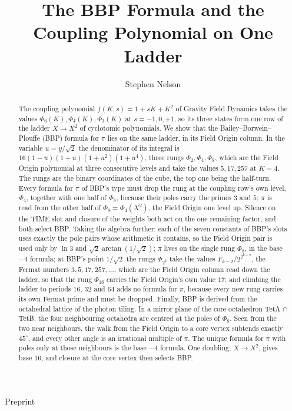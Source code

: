 \documentclass[twocolumn]{iopjournal}
\renewcommand{\articletype}[1]{%
  {\vspace*{-8mm}\noindent \Large \sf Preprint}\par
  \vspace*{6mm}\noindent{\scriptsize \sf{\bfseries \MakeUppercase{#1}}}}
\begin{document}
\articletype{Supplementary Material}

\title{The BBP Formula and the Coupling Polynomial on One Ladder}

\author{Stephen Nelson}



\begin{abstract}
The coupling polynomial $f(K,s) = 1 + sK + K^2$ of Gravity Field
Dynamics takes the values $\Phi_6(K), \Phi_4(K), \Phi_3(K)$ at
$s = -1, 0, +1$, so its three states form one row of the ladder
$X \to X^2$ of cyclotomic polynomials. We show that the
Bailey--Borwein--Plouffe (BBP) formula for $\pi$ lies on the same
ladder, in its Field Origin column. In the variable $u = y/\sqrt2$
the denominator of its integral is $16(1-u)(1+u)(1+u^2)(1+u^4)$,
three rungs $\Phi_2, \Phi_4, \Phi_8$, which are the Field Origin
polynomial at three consecutive levels and take the values $5, 17,
257$ at $K = 4$. The rungs are the binary coordinates of the cube,
the top one being the half-turn. Every formula for $\pi$ of BBP's
type must drop the rung at the coupling row's own level, $\Phi_4$,
together with one half of $\Phi_8$, because their poles carry the
primes $3$ and $5$; $\pi$ is read from the other half of $\Phi_8 =
\Phi_4(X^2)$, the Field Origin one level up. Silence on the TIME
slot and closure of the weights both act on the one remaining
factor, and both select BBP. Taking the algebra further: each of the
seven constants of BBP's slots uses exactly the pole pairs whose
arithmetic it contains, so the Field Origin pair is used only by
$\ln 3$ and $\sqrt2\arctan(1/\sqrt2)$; $\pi$ lives on the single rung
$\Phi_8$, in the base $-4$ formula; at BBP's point $1/\sqrt2$ the
rungs $\Phi_{2^k}$ take the values $F_{k-2}/2^{2^{k-2}}$, the Fermat
numbers $3, 5, 17, 257, \dots$, which are the Field Origin column read
down the ladder, so that the rung $\Phi_{16}$ carries the Field
Origin's own value $17$; and climbing the ladder to periods $16$, $32$
and $64$ adds no formula for $\pi$, because every new rung carries its
own Fermat prime and must be dropped. Finally, BBP is derived from the
octahedral lattice of the photon tiling. In a mirror plane of the core
octahedron TetA $\cap$ TetB, the four neighbouring octahedra are
centred at the poles of $\Phi_8$. Seen from the two near neighbours,
the walk from the Field Origin to a core vertex subtends exactly
$45^\circ$, and every other angle is an irrational multiple of $\pi$.
The unique formula for $\pi$ with poles only at those neighbours is
the base $-4$ formula. One doubling, $X \to X^2$, gives base $16$, and
closure at the core vertex then selects BBP.
\end{abstract}
\end{document}
